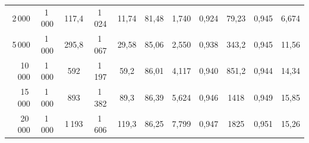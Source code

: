 \documentclass[a4paper, czech]{article}
\begin{document}
\begin{table}[H]
\begin{NiceTabular}{rccc>{}c>{}c>{}c>{}c>{}c>{}c>{}c}
        2\,000  & 1\,000 & 117,4 & 1\,024 & 11,74 & 81,48 & 1,740 & 0,924 & 79,23 & 0,945 & 6,674 \\
        5\,000  & 1\,000 & 295,8 & 1\,067 & 29,58 & 85,06 & 2,550 & 0,938 & 343,2 & 0,945 & 11,56 \\
        10\,000 & 1\,000 & 592   & 1\,197 & 59,2  & 86,01 & 4,117 & 0,940 & 851,2 & 0,944 & 14,34 \\
        15\,000 & 1\,000 & 893   & 1\,382 & 89,3  & 86,39 & 5,624 & 0,946 & 1418  & 0,949 & 15,85 \\
        20\,000 & 1\,000 & 1\,193  & 1\,606 & 119,3 & 86,25 & 7,799 & 0,947 & 1825  & 0,951 & 15,26 \\
        \bottomrule
    \end{NiceTabular}
\end{table}
\end{document}

